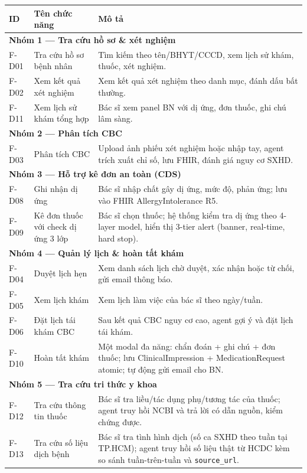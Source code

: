 \documentclass[a4paper,13pt,3p,oneside]{report}
\theoremstyle{definition}
\theoremstyle{remark}
\theoremstyle{definition}
\begin{document}
\begin{table}[H]
\centering
\begin{tabular}{|l|p{4cm}|p{8cm}|}
\hline
\textbf{ID} & \textbf{Tên chức năng} & \textbf{Mô tả} \\
\hline
\multicolumn{3}{|l|}{\textbf{Nhóm 1 --- Tra cứu hồ sơ \& xét nghiệm}} \\
\hline
F-D01 & Tra cứu hồ sơ bệnh nhân & Tìm kiếm theo tên/BHYT/CCCD, xem lịch sử khám, thuốc, xét nghiệm. \\
\hline
F-D02 & Xem kết quả xét nghiệm & Xem kết quả xét nghiệm theo danh mục, đánh dấu bất thường. \\
\hline
F-D11 & Xem lịch sử khám tổng hợp & Bác sĩ xem panel BN với dị ứng, đơn thuốc, ghi chú lâm sàng. \\
\hline
\multicolumn{3}{|l|}{\textbf{Nhóm 2 --- Phân tích CBC}} \\
\hline
F-D03 & Phân tích CBC & Upload ảnh phiếu xét nghiệm hoặc nhập tay, agent trích xuất chỉ số, lưu FHIR, đánh giá nguy cơ SXHD. \\
\hline
\multicolumn{3}{|l|}{\textbf{Nhóm 3 --- Hỗ trợ kê đơn an toàn (CDS)}} \\
\hline
F-D08 & Ghi nhận dị ứng & Bác sĩ nhập chất gây dị ứng, mức độ, phản ứng; lưu vào FHIR AllergyIntolerance R5. \\
\hline
F-D09 & Kê đơn thuốc với check dị ứng 3 lớp & Bác sĩ chọn thuốc; hệ thống kiểm tra dị ứng theo 4-layer model, hiển thị 3-tier alert (banner, real-time, hard stop). \\
\hline
\multicolumn{3}{|l|}{\textbf{Nhóm 4 --- Quản lý lịch \& hoàn tất khám}} \\
\hline
F-D04 & Duyệt lịch hẹn & Xem danh sách lịch chờ duyệt, xác nhận hoặc từ chối, gửi email thông báo. \\
\hline
F-D05 & Xem lịch khám & Xem lịch làm việc của bác sĩ theo ngày/tuần. \\
\hline
F-D06 & Đặt lịch tái khám CBC & Sau kết quả CBC nguy cơ cao, agent gợi ý và đặt lịch tái khám. \\
\hline
F-D10 & Hoàn tất khám & Một modal đa năng: chẩn đoán + ghi chú + đơn thuốc; lưu ClinicalImpression + MedicationRequest atomic; tự động gửi email cho BN. \\
\hline
\multicolumn{3}{|l|}{\textbf{Nhóm 5 --- Tra cứu tri thức y khoa}} \\
\hline
F-D12 & Tra cứu thông tin thuốc & Bác sĩ tra liều/tác dụng phụ/tương tác của thuốc; agent truy hồi NCBI và trả lời có dẫn nguồn, kiểm chứng được. \\
\hline
F-D13 & Tra cứu số liệu dịch bệnh & Bác sĩ tra tình hình dịch (số ca SXHD theo tuần tại TP.HCM); agent truy hồi số liệu thật từ HCDC kèm so sánh tuần-trên-tuần và \texttt{source\_url}. \\
\hline
\end{tabular}
\end{table}
\end{document}

